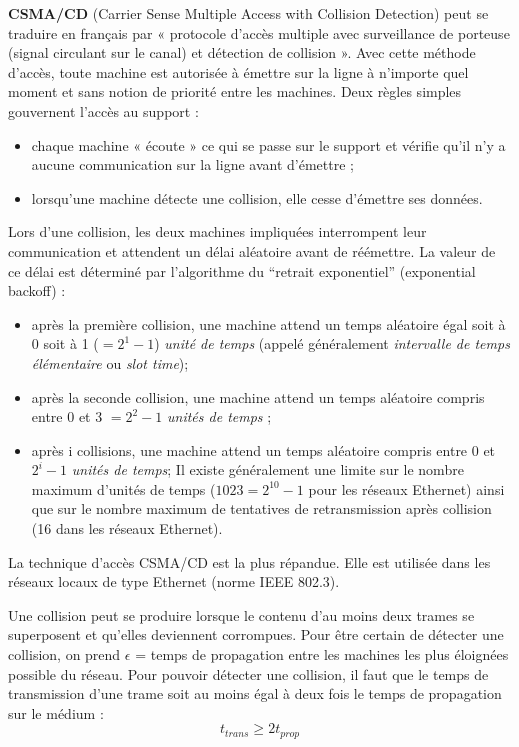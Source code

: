 \documentclass[11pt,english,french]{scrreprt}
\theoremstyle{remark}
\theoremstyle{definition}
\begin{document}
\textbf{CSMA/CD} (Carrier Sense Multiple Access with Collision Detection) peut se traduire en français par « protocole d'accès multiple avec surveillance de porteuse (signal circulant sur le canal) et détection de collision ». Avec cette méthode d’accès, toute machine est autorisée à émettre sur la ligne à n'importe quel moment et sans notion de priorité entre les machines. Deux règles simples gouvernent l’accès au support :
\begin{itemize}
	\item chaque machine « écoute » ce qui se passe sur le support et vérifie qu'il n'y a aucune communication sur la ligne avant d'émettre ;
	\item lorsqu’une machine détecte une collision, elle cesse d’émettre ses données.
\end{itemize}

Lors d’une collision, les deux machines impliquées interrompent leur communication et attendent un délai aléatoire avant de réémettre. La valeur de ce délai est déterminé par l’algorithme du  “retrait exponentiel” (exponential backoff) :
\begin{itemize}
	\item après la première collision, une machine attend un temps aléatoire égal soit à 0 soit à 1 ($= 2^1 -1$) \emph{unité de temps} (appelé généralement \emph{intervalle de temps élémentaire} ou \emph{slot time});
	\item après la seconde collision, une machine attend un temps aléatoire compris entre 0 et 3 $= 2^2 -1$ \emph{unités de temps} ;
	\item après i collisions, une machine attend un temps aléatoire compris entre 0 et $2^i -1$ \emph{unités de temps}; Il existe généralement une limite sur le nombre maximum d’unités de temps ($1023 = 2^10 - 1$ pour les réseaux Ethernet) ainsi que sur le nombre maximum de tentatives de retransmission après collision (16 dans les réseaux Ethernet).
\end{itemize}

La technique d’accès CSMA/CD est la plus répandue. Elle est utilisée dans les réseaux locaux de type Ethernet (norme IEEE 802.3).

Une collision peut se produire lorsque le contenu d’au moins deux trames se superposent et qu’elles deviennent corrompues.
Pour être certain de détecter une collision, on prend $\epsilon$ = temps de propagation entre les machines les plus éloignées possible du réseau. Pour pouvoir détecter une collision, il faut que le temps de transmission d’une trame soit au moins égal à deux fois le temps de propagation sur le médium :
\[
                 t_{trans} \ge 2 t_{prop}
\]
\end{document}
